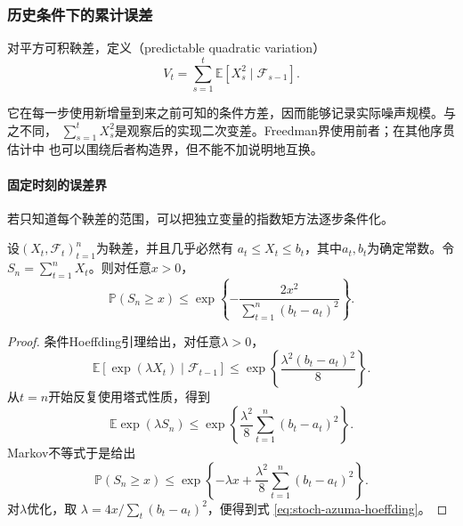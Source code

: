 \subsubsection{历史条件下的累计误差}
\begin{definition}[可预测二次变差]
  \label{def:stoch-predictable-quadratic-variation}
对平方可积鞅差，定义（predictable quadratic variation）
\begin{equation}
  V_t=\sum_{s=1}^{t}\mathbb{E}[X_s^2\mid\mathcal{F}_{s-1}].
  \label{eq:stoch-predictable-quadratic-variation}
\end{equation}
\end{definition}
它在每一步使用新增量到来之前可知的条件方差，因而能够记录实际噪声规模。与之不同，
$\sum_{s=1}^{t}X_s^2$是观察后的实现二次变差。Freedman界使用前者；在其他序贯估计中
也可以围绕后者构造界，但不能不加说明地互换。

\paragraph{固定时刻的误差界}
\label{sec:rv-fixed-time}
若只知道每个鞅差的范围，可以把独立变量的指数矩方法逐步条件化。

\begin{theorem}
  \label{thm:stoch-azuma-hoeffding}
  设$(X_t,\mathcal{F}_t)_{t=1}^{n}$为鞅差，并且几乎必然有
  $a_t\leq X_t\leq b_t$，其中$a_t,b_t$为确定常数。令
  $S_n=\sum_{t=1}^{n}X_t$。则对任意$x>0$，
  \begin{equation}
    \mathbb{P}(S_n\geq x)\leq\exp\left\{
      -\frac{2x^2}{\sum_{t=1}^{n}(b_t-a_t)^2}
    \right\}.
    \label{eq:stoch-azuma-hoeffding}
  \end{equation}
\end{theorem}

\begin{proof}
条件Hoeffding引理给出，对任意$\lambda>0$，
\[
  \mathbb{E}[
    \exp(\lambda X_t)
    \mid\mathcal{F}_{t-1}]
  \leq
  \exp\left\{
    \frac{\lambda^2(b_t-a_t)^2}{8}
  \right\}.
\]
从$t=n$开始反复使用塔式性质，得到
\[
  \mathbb{E}\exp(\lambda S_n)
  \leq
  \exp\left\{
    \frac{\lambda^2}{8}
    \sum_{t=1}^{n}(b_t-a_t)^2
  \right\}.
\]
Markov不等式于是给出
\[
  \mathbb{P}(S_n\geq x)
  \leq
  \exp\left\{
    -\lambda x+
    \frac{\lambda^2}{8}
    \sum_{t=1}^{n}(b_t-a_t)^2
  \right\}.
\]
对$\lambda$优化，取
$\lambda=4x/\sum_t(b_t-a_t)^2$，便得到式
\eqref{eq:stoch-azuma-hoeffding}。
\end{proof}


